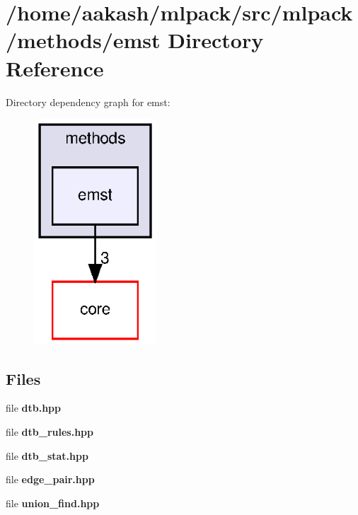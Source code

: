 \section{/home/aakash/mlpack/src/mlpack/methods/emst Directory Reference}
\label{dir_88d49b0062d70fa894a1612206b4da93}
Directory dependency graph for emst\+:
\nopagebreak
\begin{figure}[H]
\begin{center}
\leavevmode
\includegraphics[width=130pt]{dir_88d49b0062d70fa894a1612206b4da93_dep}
\end{center}
\end{figure}
\subsection*{Files}
\begin{DoxyCompactItemize}
\item 
file \textbf{ dtb.\+hpp}
\item 
file \textbf{ dtb\+\_\+rules.\+hpp}
\item 
file \textbf{ dtb\+\_\+stat.\+hpp}
\item 
file \textbf{ edge\+\_\+pair.\+hpp}
\item 
file \textbf{ union\+\_\+find.\+hpp}
\end{DoxyCompactItemize}
